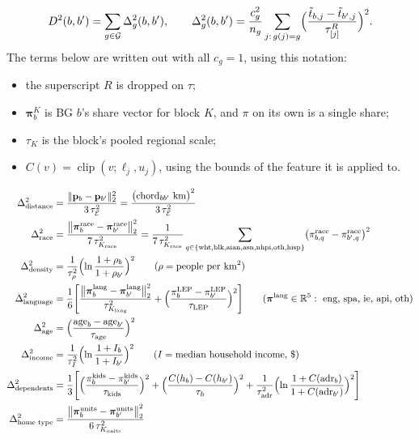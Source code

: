 \documentclass[11pt]{article}
\newcommand{\R}{\mathbb{R}}
\newcommand{\clip}{\operatorname{clip}}
\begin{document}
\[
D^2(b,b')=\sum_{g\in\mathcal G}\Delta^2_g(b,b'),\qquad
\Delta^2_g(b,b')=\frac{c_g^2}{n_g}\sum_{j:\,g(j)=g}\Bigl(\frac{\tilde t_{b,j}-\tilde t_{b',j}}{\tau^R_{[j]}}\Bigr)^2 .
\]
The terms below are written out with all $c_g=1$, using this notation:
\begin{itemize}
\item the superscript $R$ is dropped on $\tau$;
\item $\boldsymbol\pi^{K}_b$ is BG $b$'s share vector for block $K$, and $\pi$ on its own is a
  single share;
\item $\tau_K$ is the block's pooled regional scale;
\item $C(v)=\clip(v;\ell_j,u_j)$, using the bounds of the feature it is applied to.
\end{itemize}
\begin{align*}
\Delta^2_{\text{distance}}&=\frac{\|\mathbf p_b-\mathbf p_{b'}\|_2^2}{3\,\tau_{\mathcal E}^2}
 =\frac{\bigl(\text{chord}_{bb'}\ \text{km}\bigr)^2}{3\,\tau_{\mathcal E}^2}\\
\Delta^2_{\text{race}}&=\frac{\bigl\|\boldsymbol\pi^{\text{race}}_b-\boldsymbol\pi^{\text{race}}_{b'}\bigr\|_2^2}{7\,\tau_{K_{\text{race}}}^2}
 =\frac{1}{7\,\tau_{K_{\text{race}}}^2}\sum_{q\in\{\text{wht,blk,aian,asn,nhpi,oth,hisp}\}}
 \bigl(\pi^{\text{race}}_{b,q}-\pi^{\text{race}}_{b',q}\bigr)^2\\
\Delta^2_{\text{density}}&=\frac{1}{\tau_{\rho}^2}\Bigl(\ln\frac{1+\rho_b}{1+\rho_{b'}}\Bigr)^2
 \qquad(\rho=\text{people per km}^2)\\
\Delta^2_{\text{language}}&=\frac16\Biggl[
 \frac{\bigl\|\boldsymbol\pi^{\text{lang}}_b-\boldsymbol\pi^{\text{lang}}_{b'}\bigr\|_2^2}{\tau_{K_{\text{lang}}}^2}
 +\Bigl(\frac{\pi^{\text{LEP}}_b-\pi^{\text{LEP}}_{b'}}{\tau_{\text{LEP}}}\Bigr)^2\Biggr]
 \qquad(\boldsymbol\pi^{\text{lang}}\in\R^5:\ \text{eng, spa, ie, api, oth})\\
\Delta^2_{\text{age}}&=\Bigl(\frac{\text{age}_b-\text{age}_{b'}}{\tau_{\text{age}}}\Bigr)^2\\
\Delta^2_{\text{income}}&=\frac{1}{\tau_I^2}\Bigl(\ln\frac{1+I_b}{1+I_{b'}}\Bigr)^2
 \qquad(I=\text{median household income, \$})\\
\Delta^2_{\text{dependents}}&=\frac13\Biggl[
 \Bigl(\frac{\pi^{\text{kids}}_b-\pi^{\text{kids}}_{b'}}{\tau_{\text{kids}}}\Bigr)^2
 +\Bigl(\frac{C(h_b)-C(h_{b'})}{\tau_h}\Bigr)^2
 +\frac{1}{\tau_{\text{adr}}^2}\Bigl(\ln\frac{1+C(\text{adr}_b)}{1+C(\text{adr}_{b'})}\Bigr)^2\Biggr]\\
\Delta^2_{\text{home type}}&=\frac{\bigl\|\boldsymbol\pi^{\text{units}}_b-\boldsymbol\pi^{\text{units}}_{b'}\bigr\|_2^2}{6\,\tau_{K_{\text{units}}}^2}

\end{align*}
\end{document}
